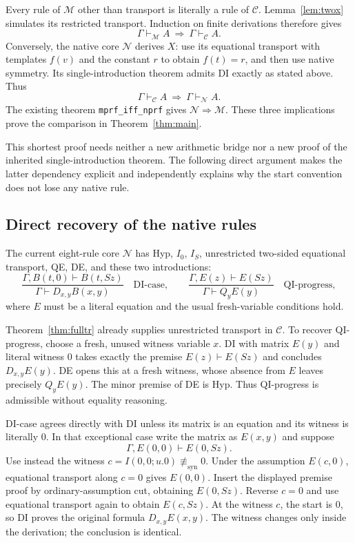 \documentclass[11pt]{article}
\theoremstyle{definition}\newtheorem{definition}[theorem]{Definition}
\theoremstyle{remark}\newtheorem{remark}[theorem]{Remark}
\newcommand{\C}{\mathcal C}
\newcommand{\N}{\mathcal N}
\newcommand{\M}{\mathcal M}
\newcommand{\nolit}{\not\equiv_{\mathrm{syn}}}
\begin{document}
Every rule of $\M$ other than transport is literally a rule of $\C$.
Lemma~\ref{lem:twox} simulates its restricted transport. Induction on
finite derivations therefore gives
\[
               \Gamma\vdash_{\M}A\ \Longrightarrow\
               \Gamma\vdash_{\C}A.
\]
Conversely, the native core $\N$ derives $X$: use its equational
transport with templates $f(v)$ and the constant $r$ to obtain
$f(t)=r$, and then use native symmetry. Its single-introduction theorem
admits DI exactly as stated above. Thus
\[
               \Gamma\vdash_{\C}A\ \Longrightarrow\
               \Gamma\vdash_{\N}A.
\]
The existing theorem \texttt{mprf\_iff\_nprf} gives
$\N\Rightarrow\M$\cite{minimal}. These three implications prove the
comparison in Theorem~\ref{thm:main}.

This shortest proof needs neither a new arithmetic bridge nor a new
proof of the inherited single-introduction theorem. The following direct
argument makes the latter dependency explicit and independently explains
why the start convention does not lose any native rule.

\subsection{Direct recovery of the native rules}

The current eight-rule core $\N$ has Hyp, $I_0$, $I_S$, unrestricted
two-sided equational transport, QE, DE, and these two introductions:
\[
 \frac{\Gamma,B(t,0)\vdash B(t,Sz)}
      {\Gamma\vdash D_{x,y}B(x,y)}\quad\mathrm{DI\text{-}case},
 \qquad
 \frac{\Gamma,E(z)\vdash E(Sz)}
      {\Gamma\vdash Q_yE(y)}\quad\mathrm{QI\text{-}progress},
 \tag{Native introductions}\label{eq:nintro}
\]
where $E$ must be a literal equation and the usual fresh-variable
conditions hold\cite{native}.

Theorem~\ref{thm:fulltr} already supplies unrestricted transport in
$\C$. To recover QI-progress, choose a fresh, unused witness variable
$x$. DI with matrix $E(y)$ and literal witness $0$ takes exactly the
premise $E(z)\vdash E(Sz)$ and concludes $D_{x,y}E(y)$. DE opens
this at a fresh witness, whose absence from $E$ leaves precisely
$Q_yE(y)$. The minor premise of DE is Hyp. Thus QI-progress is
admissible without equality reasoning.

DI-case agrees directly with DI unless its matrix is an equation and
its witness is literally $0$. In that exceptional case write the matrix
as $E(x,y)$ and suppose
\[
        \Gamma,E(0,0)\vdash E(0,Sz).
\]
Use instead the witness $c=I(0,0;u.0)\nolit0$. Under the assumption
$E(c,0)$, equational transport along $c=0$ gives $E(0,0)$.
Insert the displayed premise proof by ordinary-assumption cut, obtaining
$E(0,Sz)$. Reverse $c=0$ and use equational transport again to obtain
$E(c,Sz)$. At the witness $c$, the start is $0$, so DI proves the
original formula $D_{x,y}E(x,y)$. The witness changes only inside the
derivation; the conclusion is identical.
\end{document}
